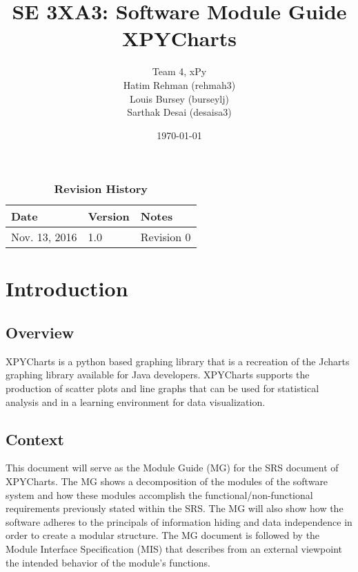 \documentclass[12pt, titlepage]{article}
\title{SE 3XA3: Software Module Guide\\XPYCharts}
\author{Team 4, xPy
		\\ Hatim Rehman (rehmah3)
		\\ Louis Bursey (burseylj)
		\\ Sarthak Desai (desaisa3)
}
\date{\today}
\begin{document}
\maketitle

\tableofcontents
\listoftables
\listoffigures

\begin{table}[bp]
\caption{\bf Revision History}
\begin{tabularx}{\textwidth}{p{3cm}p{2cm}X}
\toprule {\bf Date} & {\bf Version} & {\bf Notes}\\
\midrule
Nov. 13, 2016 & 1.0 & Revision 0\\

\bottomrule
\end{tabularx}
\end{table}

\newpage


\section{Introduction}
\subsection{Overview}
XPYCharts is a python based graphing library that is a recreation of the Jcharts graphing library available for Java developers. XPYCharts supports the production of scatter plots and line graphs that can be used for statistical analysis and in a learning environment for data visualization.
\subsection{Context}
This document will serve as the Module Guide (MG) for the SRS document of XPYCharts. The MG shows a decomposition of the modules of the software system and how these modules accomplish the functional/non-functional requirements previously stated within the SRS. The MG will also show how the software adheres to the principals of information hiding and data independence in order to create a modular structure. The MG document is followed by the Module Interface Specification (MIS) that describes from an external viewpoint the intended behavior of the module’s functions. 
\end{document}
